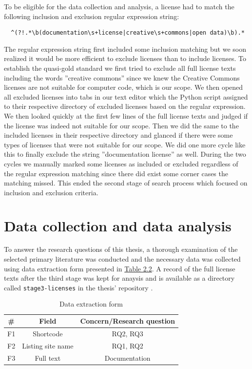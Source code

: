 To be eligible for the data collection and analysis, a license had to match the following inclusion and exclusion regular expression string:
\begin{verbatim}
  ^(?!.*\b(documentation\s+license|creative\s+commons|open data)\b).*
\end{verbatim}

The regular expression string first included some inclusion matching but we soon realized it would be more efficient to exclude licenses than to include licenses. To establish the quasi-gold standard we first tried to exclude all full license texts including the words ''creative commons'' since we knew the Creative Commons licenses are not suitable for computer code, which is our scope. We then opened all excluded licenses into tabs in our text editor which the Python script assigned to their respective directory of excluded licenses based on the regular expression. We then looked quickly at the first few lines of the full license texts and judged if the license was indeed not suitable for our scope. Then we did the same to the included licenses in their respective directory and glanced if there were some types of licenses that were not suitable for our scope. We did one more cycle like this to finally exclude the string ''documentation license'' as well. During the two cycles we manually marked some licenses as included or excluded regardless of the regular expression matching since there did exist some corner cases the matching missed. This ended the second stage of search process which focused on inclusion and exclusion criteria.

\section{Data collection and data analysis}
To answer the research questions of this thesis, a thorough examination of the selected primary literature was conducted and the necessary data was collected using data extraction form presented in \hyperref[table:extraction]{Table 2.2}. A record of the full license texts after the third stage was kept for anaysis and is available as a directory called \texttt{stage3-licenses} in the thesis' repository \citep{mscthesis}.

\begin{table}[t]
	\begin{center}
		\begin{tabular}{||c c c||} 
			\hline
			\# & Field & Concern/Research question \\
			\hline
			F1 & Shortcode & RQ2, RQ3 \\
			F2 & Listing site name & RQ1, RQ2 \\
			F3 & Full text &  Documentation\\
			\hline
		\end{tabular}
		\caption{Data extraction form}
		\label{table:extraction}
	\end{center}
\end{table}

